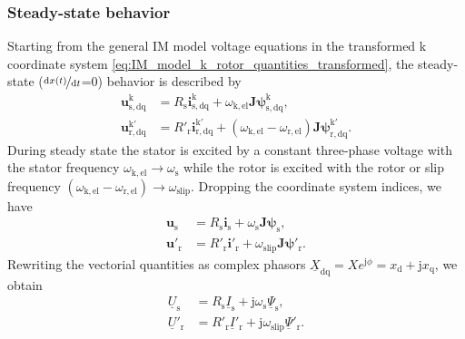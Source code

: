 \begin{frame}
	\frametitle{Steady-state behavior}
    Starting from the general IM model voltage equations in the transformed k coordinate system \eqref{eq:IM_model_k_rotor_quantities_transformed}, the steady-state ($\nicefrac{\mathrm{d}x(t)}{\mathrm{d}t}$=0) behavior is described by
    \begin{equation}
        \begin{alignedat}{2}
            \bm{u}^\mathrm{k}_\mathrm{s,dq} &= R_\mathrm{s} \bm{i}^\mathrm{k}_\mathrm{s,dq} + \omega_\mathrm{k,el}\bm{J} \bm{\psi}^\mathrm{k}_\mathrm{s,dq},\\
            \bm{u}^\mathrm{k'}_\mathrm{r,dq} &= R'_\mathrm{r} \bm{i}^\mathrm{k'}_\mathrm{r,dq} +\left(\omega_\mathrm{k,el}-\omega_\mathrm{r,el}\right)\bm{J}\bm{\psi}^\mathrm{k'}_\mathrm{r,dq}.
        \end{alignedat}
    \end{equation}
    During steady state the stator is excited by a constant three-phase voltage with the stator frequency $\omega_\mathrm{k,el} \rightarrow \omega_\mathrm{s}$ while the rotor is excited with the rotor  or slip frequency $(\omega_\mathrm{k,el}-\omega_\mathrm{r,el}) \rightarrow \omega_\mathrm{slip}$. Dropping the coordinate system indices, we have
    \begin{equation}
        \begin{alignedat}{2}
            \bm{u}_\mathrm{s} &= R_\mathrm{s} \bm{i}_\mathrm{s} + \omega_\mathrm{s}\bm{J} \bm{\psi}_\mathrm{s},\\
            \bm{u}'_\mathrm{r} &= R'_\mathrm{r} \bm{i}'_\mathrm{r} +\omega_\mathrm{slip}\bm{J}\bm{\psi}'_\mathrm{r}.
        \end{alignedat}
    \end{equation}
    Rewriting the vectorial quantities as complex phasors $\underline{X}_\mathrm{dq} = X e^{\mathrm{j}\phi}=x_\mathrm{d} + \mathrm{j} x_\mathrm{q}$, we obtain
    \begin{equation}
        \begin{alignedat}{2}
            \underline{U}_\mathrm{s} &= R_\mathrm{s} \underline{I}_\mathrm{s} + \mathrm{j}\omega_\mathrm{s}\underline{\Psi}_\mathrm{s},\\
            \underline{U}'_\mathrm{r} &= R'_\mathrm{r} \underline{I}'_\mathrm{r} +\mathrm{j}\omega_\mathrm{slip}\underline{\Psi}'_\mathrm{r}.
        \end{alignedat}
        \label{eq:IM_model_voltage_equations_steady_state}
    \end{equation}
\end{frame}

